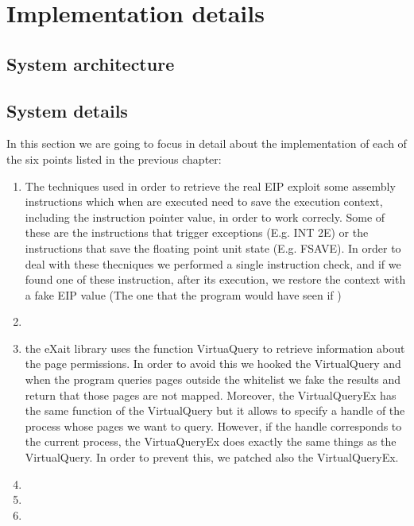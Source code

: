 \chapter{Implementation details}
\label{chapter4}
\thispagestyle{empty}

\section{System architecture}

\section{System details}
In this section we are going to focus in detail about the implementation of each of the six points listed in the previous chapter:
\begin{enumerate}
\item The techniques used in order to retrieve the real EIP exploit some assembly instructions which when are executed need to save the execution context, including the instruction pointer value, in order to work correcly. Some of these are the instructions that trigger exceptions (E.g. INT 2E) or the instructions that save the floating point unit state (E.g. FSAVE). In order to deal with these thecniques we performed a single instruction check, and if we found one of these instruction, after its execution, we restore the context with a fake EIP value (The one that the program would have seen if )
\item
\item the eXait library uses the function VirtuaQuery to retrieve information about the page permissions. In order to avoid this we hooked the VirtualQuery and when the program queries pages outside the whitelist we fake the results and return that those pages are not mapped. Moreover, the VirtualQueryEx has the same function of the VirtualQuery but it allows to specify a handle of the process whose pages we want to query. However, if the handle corresponds to the current process, the VirtuaQueryEx does exactly the same things as the VirtualQuery. In order to prevent this, we patched also the VirtualQueryEx.
\item
\item
\item
\end{enumerate}
